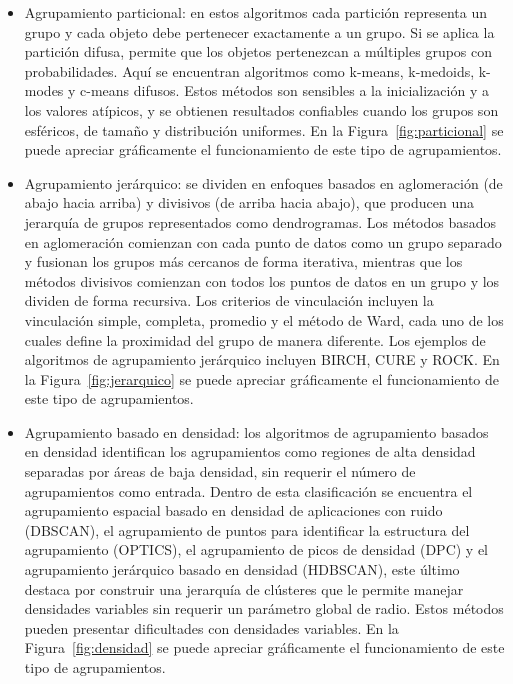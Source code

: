 \begin{itemize}
  \item Agrupamiento particional: en estos algoritmos cada partición representa un grupo y cada objeto debe pertenecer exactamente a un grupo. Si se aplica la partición difusa, permite que los objetos pertenezcan a múltiples grupos con probabilidades. Aquí se encuentran algoritmos como k-means, k-medoids, k-modes y c-means difusos. Estos métodos son sensibles a la inicialización y a los valores atípicos, y se obtienen resultados confiables cuando los grupos son esféricos, de tama\~no y distribución uniformes. En la Figura~\ref{fig:particional} se puede apreciar gráficamente el funcionamiento de este tipo de agrupamientos.
  \item Agrupamiento jerárquico: se dividen en enfoques basados en aglomeración (de abajo hacia arriba) y divisivos (de arriba hacia abajo), que producen una jerarquía de grupos representados como dendrogramas. Los métodos basados en aglomeración comienzan con cada punto de datos como un grupo separado y fusionan los grupos más cercanos de forma iterativa, mientras que los métodos divisivos comienzan con todos los puntos de datos en un grupo y los dividen de forma recursiva. Los criterios de vinculación incluyen la vinculación simple, completa, promedio y el método de Ward, cada uno de los cuales define la proximidad del grupo de manera diferente. Los ejemplos de algoritmos de agrupamiento jerárquico incluyen BIRCH, CURE y ROCK. En la Figura~\ref{fig:jerarquico} se puede apreciar gráficamente el funcionamiento de este tipo de agrupamientos.
  \item Agrupamiento basado en densidad: los algoritmos de agrupamiento basados en densidad identifican los agrupamientos como regiones de alta densidad separadas por áreas de baja densidad, sin requerir el número de agrupamientos como entrada. Dentro de esta clasificación se encuentra el agrupamiento espacial basado en densidad de aplicaciones con ruido (DBSCAN), el agrupamiento de puntos para identificar la estructura del agrupamiento (OPTICS), el agrupamiento de picos de densidad (DPC) y el agrupamiento jerárquico basado en densidad (HDBSCAN), este último destaca por construir una jerarquía de clústeres que le permite manejar densidades variables sin requerir un parámetro global de radio. Estos métodos pueden presentar dificultades con densidades variables. En la Figura~\ref{fig:densidad} se puede apreciar gráficamente el funcionamiento de este tipo de agrupamientos.
\end{itemize}

